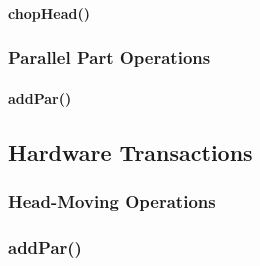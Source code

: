 \paragraph{chopHead()}

\subsubsection{Parallel Part Operations}

\paragraph{addPar()}

\subsection{Hardware Transactions}

\subsubsection{Head-Moving Operations}

\subsubsection{addPar()}
